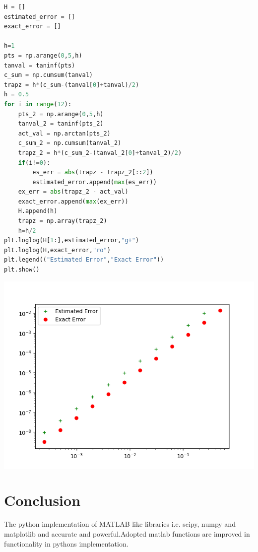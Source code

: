 \documentclass[letterpaper, 12pt]{article}
\begin{document}
\begin{lstlisting}[language=Python , caption=Computing estimated and exact error and plotting them.]
H = []
estimated_error = []
exact_error = []

h=1
pts = np.arange(0,5,h)
tanval = taninf(pts)
c_sum = np.cumsum(tanval)
trapz = h*(c_sum-(tanval[0]+tanval)/2)
h = 0.5
for i in range(12):
	pts_2 = np.arange(0,5,h)
	tanval_2 = taninf(pts_2)
	act_val = np.arctan(pts_2)
	c_sum_2 = np.cumsum(tanval_2)
	trapz_2 = h*(c_sum_2-(tanval_2[0]+tanval_2)/2)	
	if(i!=0):
		es_err = abs(trapz - trapz_2[::2])
		estimated_error.append(max(es_err))
	ex_err = abs(trapz_2 - act_val)
	exact_error.append(max(ex_err))
	H.append(h)
	trapz = np.array(trapz_2)
	h=h/2
plt.loglog(H[1:],estimated_error,"g+")
plt.loglog(H,exact_error,"ro")
plt.legend(("Estimated Error","Exact Error"))
plt.show()
\end{lstlisting}
\begin{multicols}{2}
\includegraphics[width=\columnwidth]{Figure_1-5.png}
\section{Conclusion}
The python implementation of MATLAB like libraries i.e. scipy, numpy and matplotlib and accurate and powerful.Adopted matlab functions are improved in functionality in pythons implementation.   
\begin{flushright}
\end{flushright}
\end{multicols}
\end{document}
